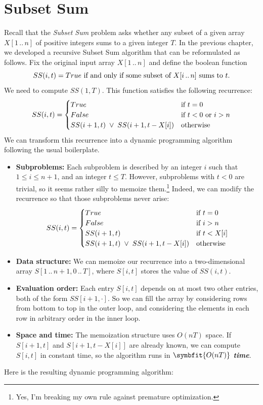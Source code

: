 \section{Subset Sum}
\label{sec:3.8}

Recall that the \textit{Subset Sum} problem asks whether any subset of a given array $X[1\,..\,n]$ of positive integers sums to a given integer $T$.
In the previous chapter, we developed a recursive Subset Sum algorithm that can be reformulated as follows.
Fix the original input array $X[1\,..\,n]$ and define the boolean function
\[
SS(i, t) = True \text{ if and only if some subset of } X[i\,..\,n] \text{ sums to } t.
\]
We need to compute $SS(1, T)$.
This function satisfies the following recurrence:
\[
SS(i, t) = \begin{cases}
True & \text{if } t = 0\\
False & \text{if } t < 0 \text{ or } i > n\\
SS(i+1, t) \;\vee\; SS(i+1, t - X[i]) & \text{otherwise}
\end{cases}
\]
We can transform this recurrence into a dynamic programming algorithm following the usual boilerplate.
\begin{itemize}
\item \textbf{Subproblems:} Each subproblem is described by an integer $i$ such that $1 \le i \le n+1$, and an integer $t \le T$.
However, subproblems with $t < 0$ are trivial, so it seems rather silly to memoize them.\footnote{Yes, I’m breaking my own rule against premature optimization.}
Indeed, we can modify the recurrence so that those subproblems never arise:
\[
SS(i, t) = \begin{cases}
True & \text{if } t = 0\\
False & \text{if } i > n\\
SS(i+1, t) & \text{if } t < X[i]\\
SS(i+1, t) \;\vee\; SS(i+1, t - X[i]) & \text{otherwise}
\end{cases}
\]
\item \textbf{Data structure:} We can memoize our recurrence into a two-dimensional array $S[1\,..\,n+1, 0\,..\,T]$, where $S[i, t]$ stores the value of $SS(i, t)$.
\item \textbf{Evaluation order:} Each entry $S[i, t]$ depends on at most two other entries, both of the form $SS[i+1, \cdot]$.
So we can fill the array by considering rows from bottom to top in the outer loop, and considering the elements in each row in arbitrary order in the inner loop.
\item \textbf{Space and time:} The memoization structure uses $O(nT)$ space.
If $S[i+1, t]$ and $S[i+1, t - X[i]]$ are already known, we can compute $S[i, t]$ in constant time, so the algorithm runs in \textbf{\textit{$\symbfit{O(nT)}$ time}}.
\end{itemize}
Here is the resulting dynamic programming algorithm:

